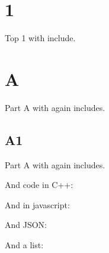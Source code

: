 \hypertarget{section}{%
\section{1}\label{section}}

Top 1 with include.

\hypertarget{a}{%
\section{A}\label{a}}

Part A with again includes.

\hypertarget{a1}{%
\subsection{A1}\label{a1}}

Part A with again includes.

And code in C++:

\begin{Shaded}
\begin{Highlighting}[]
\OperatorTok{()\{\}}
\end{Highlighting}
\end{Shaded}

And in javascript:

\begin{Shaded}
\begin{Highlighting}[]
\OperatorTok{=}\KeywordTok{=\textgreater{}} 
\end{Highlighting}
\end{Shaded}

And JSON:

\begin{Shaded}
\begin{Highlighting}[]
\FunctionTok{\{}
  \FunctionTok{:} \OtherTok{[}\OtherTok{,} \OtherTok{,} \OtherTok{,} \OtherTok{,} \OtherTok{,} \OtherTok{]}\FunctionTok{,}
  \FunctionTok{:} \FunctionTok{\{}
    \FunctionTok{:} \FunctionTok{\{}
      \FunctionTok{:} \OtherTok{[]}
    \FunctionTok{\}}
  \FunctionTok{\}}
\FunctionTok{\}}
\end{Highlighting}
\end{Shaded}

And a list:

